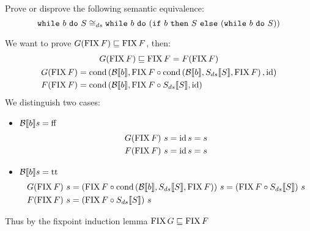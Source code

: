 \begin{exercise}{
    Prove or disprove the following semantic equivalence:
    \[ \wwhile{b}{S} \cong_{ds} \wwhile{b}{(\wif{b}{S}{(\wwhile{b}{S})})} \]
}
\begin{itemize}
            We want to prove $G (\FIX F) \sqsubseteq \FIX F$, then:
            \begin{gather*}
                G (\FIX F) \sqsubseteq \FIX F = F(\FIX F) \\
                \begin{align*}
                    G (\FIX F) &= \cond{\Bool{b}}{\FIX F \circ \cond{\Bool{b}}{\Sds{S}}{\FIX F}}{\id} \\
                    F (\FIX F) &= \cond{\Bool{b}}{\FIX F \circ \Sds{S}}{\id}
                \end{align*}
            \end{gather*}
            We distinguish two cases:
            \begin{itemize}
                \item $\Bool{b} s = \text{ff}$
                    \begin{align*}
                        G (\FIX F)\ s = \id s = s \\
                        F (\FIX F)\ s = \id s = s
                    \end{align*}
                \item $\Bool{b} s = \text{tt}$
                    \begin{align*}
                        G (\FIX F)\ s &= (\FIX F \circ \cond{\Bool{b}}{\Sds{S}}{\FIX F})\ s = (\FIX F \circ \Sds{S})\ s \\
                        F (\FIX F)\ s &= (\FIX F \circ \Sds{S})\ s
                    \end{align*}
            \end{itemize}
            Thus by the fixpoint induction lemma $\FIX G \sqsubseteq \FIX F$
    \end{itemize}
\end{exercise}
